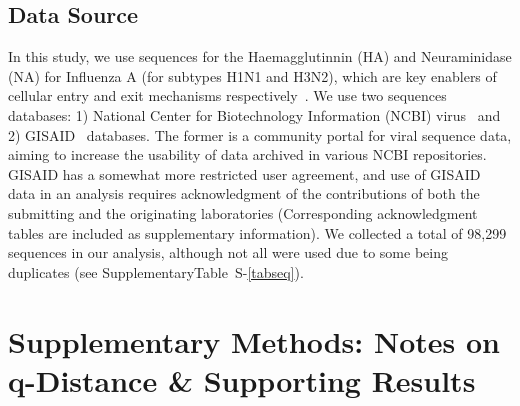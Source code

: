 \documentclass[onecolumn, compsoc,10pt]{IEEEtran}
\def\SUPPLEMENTARY{Supplementary}
\begin{document}
\subsection*{Data Source}

In this study, we use sequences for the Haemagglutinnin (HA)  and Neuraminidase (NA) for Influenza A (for subtypes H1N1 and H3N2), which are key enablers of cellular entry and exit mechanisms respectively~\cite{mcauley2019influenza}. We use two sequences databases: 1) National Center for Biotechnology Information (NCBI) virus~\cite{hatcher2017virus} and 2) GISAID~\cite{bogner2006global} databases. The former is a community portal for viral sequence data, aiming to increase the usability of data archived in various NCBI repositories. GISAID has a somewhat more restricted user agreement, and use of GISAID data in an analysis requires acknowledgment of the contributions of both the submitting and the originating laboratories (Corresponding acknowledgment tables are included as supplementary information). We collected a total of 98,299 sequences in our analysis, although not all were used due to some being duplicates (see \SUPPLEMENTARY Table~S-\ref{tabseq}).








\clearpage                                                                      
\setcounter{figure}{0}                                    \renewcommand{\figurename}{Extended Data Figure}                               
\setcounter{table}{0}                                     
\renewcommand{\tablename}{Extended Data Table}                                 






\clearpage



\section*{Supplementary Methods: Notes on q-Distance \& Supporting Results}
\end{document}

